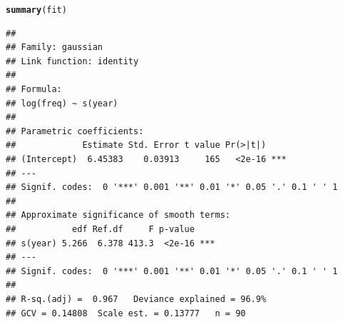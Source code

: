 \documentclass{article}\usepackage[]{graphicx}\usepackage[]{color}
\makeatletter
\newcommand{\hlstd}[1]{\textcolor[rgb]{0.345,0.345,0.345}{#1}}%
\newcommand{\hlkwd}[1]{\textcolor[rgb]{0.737,0.353,0.396}{\textbf{#1}}}%
\newenvironment{kframe}{%
 \def\at@end@of@kframe{}%
 \ifinner\ifhmode%
  \def\at@end@of@kframe{\end{minipage}}%
  \begin{minipage}{\columnwidth}%
 \fi\fi%
 \def\FrameCommand##1{\hskip\@totalleftmargin \hskip-\fboxsep
 \colorbox{shadecolor}{##1}\hskip-\fboxsep
     \hskip-\linewidth \hskip-\@totalleftmargin \hskip\columnwidth}%
 \MakeFramed {\advance\hsize-\width
   \@totalleftmargin\z@ \linewidth\hsize
   \@setminipage}}%
 {\par\unskip\endMakeFramed%
 \at@end@of@kframe}
\newenvironment{knitrout}{}{} %
\makeatother
\begin{document}
\begin{knitrout}
\color{fgcolor}\begin{kframe}
\begin{alltt}
\hlkwd{summary}\hlstd{(fit)}
\end{alltt}
\begin{verbatim}
## 
## Family: gaussian 
## Link function: identity 
## 
## Formula:
## log(freq) ~ s(year)
## 
## Parametric coefficients:
##             Estimate Std. Error t value Pr(>|t|)    
## (Intercept)  6.45383    0.03913     165   <2e-16 ***
## ---
## Signif. codes:  0 '***' 0.001 '**' 0.01 '*' 0.05 '.' 0.1 ' ' 1
## 
## Approximate significance of smooth terms:
##           edf Ref.df     F p-value    
## s(year) 5.266  6.378 413.3  <2e-16 ***
## ---
## Signif. codes:  0 '***' 0.001 '**' 0.01 '*' 0.05 '.' 0.1 ' ' 1
## 
## R-sq.(adj) =  0.967   Deviance explained = 96.9%
## GCV = 0.14808  Scale est. = 0.13777   n = 90
\end{verbatim}
\end{kframe}
\end{knitrout}
\end{document}
